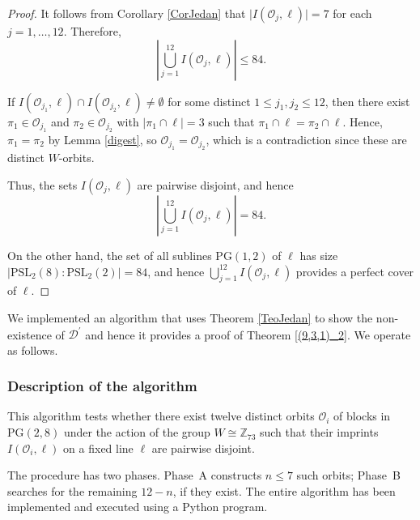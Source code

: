 \documentclass[a4paper, 11pt]{article}
\theoremstyle{definition}
\theoremstyle{definition}
\theoremstyle{definition}
\numberwithin{equation}{section}
\begin{document}
\begin{proof}
	It follows from Corollary \ref{CorJedan} that $\lvert I(\mathcal{O}_{j},\ell) \rvert = 7$ for each $j = 1, \dots, 12$. Therefore,
	\[
	\left\lvert \bigcup_{j=1}^{12} I(\mathcal{O}_{j},\ell) \right\rvert \leq 84.
	\]
	
	If $I(\mathcal{O}_{j_{1}},\ell) \cap I(\mathcal{O}_{j_{2}},\ell) \neq \emptyset$ for some distinct $1 \leq j_{1}, j_{2} \leq 12$, then there exist $\pi_{1} \in \mathcal{O}_{j_{1}}$ and $\pi_{2} \in \mathcal{O}_{j_{2}}$ with $\lvert \pi_{1} \cap \ell \rvert = 3$ such that $\pi_{1} \cap \ell = \pi_{2} \cap \ell$. Hence, $\pi_{1} = \pi_{2}$ by Lemma \ref{digest}, so $\mathcal{O}_{j_{1}} = \mathcal{O}_{j_{2}}$, which is a contradiction since these are distinct $W$-orbits. 
	
	Thus, the sets $I(\mathcal{O}_{j},\ell)$ are pairwise disjoint, and hence
	\[
	\left\lvert \bigcup_{j=1}^{12} I(\mathcal{O}_{j},\ell) \right\rvert = 84.
	\]
	
	On the other hand, the set of all sublines $\mathrm{PG}(1,2)$ of $\ell$ has size $\lvert \mathrm{PSL}_{2}(8) : \mathrm{PSL}_{2}(2) \rvert = 84$, and hence $\bigcup_{j=1}^{12} I(\mathcal{O}_{j},\ell)$ provides a perfect cover of $\ell$.
\end{proof}

We implemented an algorithm that uses Theorem \ref{TeoJedan} to show
the non-existence of $\mathcal{D}^{\prime }$ and hence it provides a proof of Theorem \ref{(9,3,1)_2}. We operate as follows.


\subsubsection{Description of the algorithm}


This algorithm tests whether there exist twelve distinct orbits
$\mathcal{O}_i$ of blocks in $\mathrm{PG}(2,8)$ under the action of the group
$W \cong \mathbb{Z}_{73}$ such that their imprints $I(\mathcal{O}_i,\ell)$ on a fixed line
$\ell$ are pairwise disjoint.

The procedure has two phases. Phase~A constructs  $n\le 7$ such
orbits; Phase~B searches for the remaining $12-n$, if they exist. The entire algorithm has been implemented and executed using a Python program.
\end{document}
